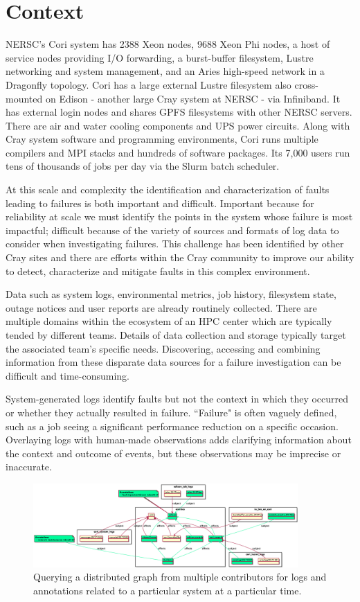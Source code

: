 \section{Context}
NERSC's Cori system has 2388 Xeon nodes, 9688 Xeon Phi nodes, a host of service nodes
providing I/O forwarding, a burst-buffer filesystem, Lustre networking and
system management, and an Aries high-speed network in a Dragonfly topology. Cori
has a large external Lustre filesystem also cross-mounted on Edison - another
large Cray system at NERSC - via Infiniband. It has external login nodes and shares
GPFS filesystems with other NERSC servers. There are air and water cooling
components and UPS power circuits. Along with Cray system software
and programming environments, Cori runs multiple compilers and MPI stacks and
hundreds of software packages. Its 7,000 users run tens of thousands of jobs per
day via the Slurm batch scheduler.

At this scale and complexity the identification and characterization of faults
leading to failures is both important and difficult. Important because for
reliability at scale we must identify the points in the system whose failure is
most impactful; difficult because of the variety of sources and formats of log
data to consider when investigating failures.
This challenge has been identified by other Cray sites and there are efforts within
the Cray community to improve our ability to detect, characterize and mitigate
faults in this complex environment.

Data such as system logs, environmental metrics, job history, filesystem state,
outage notices and user reports are already routinely collected. There are
multiple domains within the ecosystem of an HPC center which are typically
tended by different teams. Details of data collection and storage typically
target the associated team's specific needs. Discovering, accessing and
combining information from these disparate data
sources for a failure investigation can be difficult and time-consuming.

System-generated logs identify faults but not the context in which they
occurred or whether they actually resulted in failure. ``Failure" is often
vaguely defined, such as a job seeing a significant performance reduction on a
specific occasion. Overlaying logs with human-made observations adds clarifying
information about the context and outcome of events, but these observations may
be imprecise or inaccurate.

\begin{figure}
  \includegraphics[width=0.9\textwidth]{datasets-example}
  \caption{Querying a distributed graph from multiple
contributors for logs and annotations related to a particular system at a
particular time.}
\end{figure}


